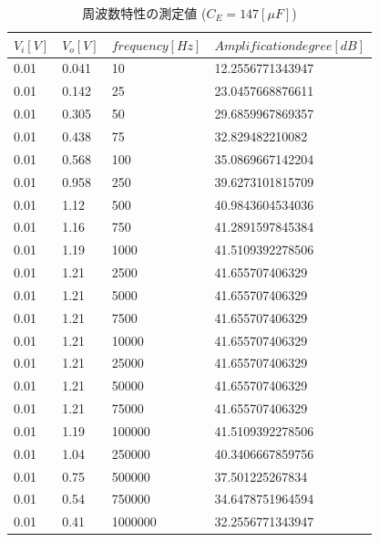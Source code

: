 \documentclass[10pt, a4j, dvipdfmx]{jarticle}
\begin{document}
    \begin{table}[H]
        \centering
        \caption{周波数特性の測定値 ($C_E = 147[\mu F]$)}
        \label{tbl:14}
        \small
        \begin{tabular}{|l|l|l|l|}
        \hline
        $V_i[V]$ & $V_o[V]$ & $frequency[Hz]$ & $Amplification degree[dB]$ \\ \hline
        0.01     & 0.041    & 10              & 12.2556771343947           \\ \hline
        0.01     & 0.142    & 25              & 23.0457668876611           \\ \hline
        0.01     & 0.305    & 50              & 29.6859967869357           \\ \hline
        0.01     & 0.438    & 75              & 32.829482210082            \\ \hline
        0.01     & 0.568    & 100             & 35.0869667142204           \\ \hline
        0.01     & 0.958    & 250             & 39.6273101815709           \\ \hline
        0.01     & 1.12     & 500             & 40.9843604534036           \\ \hline
        0.01     & 1.16     & 750             & 41.2891597845384           \\ \hline
        0.01     & 1.19     & 1000            & 41.5109392278506           \\ \hline
        0.01     & 1.21     & 2500            & 41.655707406329            \\ \hline
        0.01     & 1.21     & 5000            & 41.655707406329            \\ \hline
        0.01     & 1.21     & 7500            & 41.655707406329            \\ \hline
        0.01     & 1.21     & 10000           & 41.655707406329            \\ \hline
        0.01     & 1.21     & 25000           & 41.655707406329            \\ \hline
        0.01     & 1.21     & 50000           & 41.655707406329            \\ \hline
        0.01     & 1.21     & 75000           & 41.655707406329            \\ \hline
        0.01     & 1.19     & 100000          & 41.5109392278506           \\ \hline
        0.01     & 1.04     & 250000          & 40.3406667859756           \\ \hline
        0.01     & 0.75     & 500000          & 37.501225267834            \\ \hline
        0.01     & 0.54     & 750000          & 34.6478751964594           \\ \hline
        0.01     & 0.41     & 1000000         & 32.2556771343947           \\ \hline
        \end{tabular}
        \normalsize
    \end{table}
\end{document}
